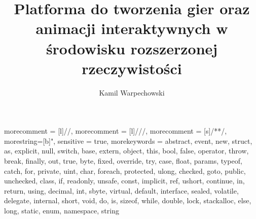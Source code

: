 
\usepackage[final]{graphicx}


\usepackage{url}
\usepackage{color}
\usepackage{lmodern}
\usepackage{caption}
\usepackage{listings}
\title{Platforma do tworzenia gier oraz animacji interaktywnych w środowisku rozszerzonej rzeczywistości}
\author{Kamil Warpechowski}

\linespread{1.5}


{
   \fancyhf{}
}

\usepackage{color}

{
 morecomment = [l]{//}, 
 morecomment = [l]{///},
 morecomment = [s]{/*}{*/},
 morestring=[b]", 
 sensitive = true,
 morekeywords = {abstract,  event,  new,  struct,
   as,  explicit,  null,  switch,
   base,  extern,  object,  this,
   bool,  false,  operator,  throw,
   break,  finally,  out,  true,
   byte,  fixed,  override,  try,
   case,  float,  params,  typeof,
   catch,  for,  private,  uint,
   char,  foreach,  protected,  ulong,
   checked,  goto,  public,  unchecked,
   class,  if,  readonly,  unsafe,
   const,  implicit,  ref,  ushort,
   continue,  in,  return,  using,
   decimal,  int,  sbyte,  virtual,
   default,  interface,  sealed,  volatile,
   delegate,  internal,  short,  void,
   do,  is,  sizeof,  while,
   double,  lock,  stackalloc,   
   else,  long,  static,   
   enum,  namespace,  string}
}



\setlength{\parindent}{1em}
\overfullrule=2cm